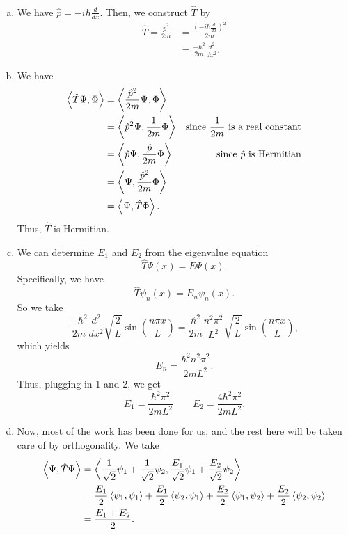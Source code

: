 \documentclass[12pt]{article} %
\begin{document}
\begin{solution}~
	\begin{enumerate}[(a)]
		\item We have $\hat{p}=-i\hbar \frac{d}{dx}$. Then, we construct $\hat{T}$ by
		\begin{align*}
		\hat{T}=\frac{\hat{p}^2}{2m} &= \frac{\left(-i\hbar \frac{d}{dx}\right)^2}{2m}\\
		&= \frac{-\hbar^2}{2m}\frac{d^2}{dx^2}.
		\end{align*}
		
		\item We have
		\begin{align*}
		\left\langle \hat{T}\Psi, \Phi \right\rangle &= \left\langle \frac{\hat{p}^2}{2m}\Psi, \Phi \right\rangle\\
		&= \left\langle \hat{p}^2 \Psi, \frac{1}{2m}\Phi \right\rangle &\textrm{since $\frac{1}{2m}$ is a real constant}\\
		&= \left\langle \hat{p}\Psi, \frac{\hat{p}}{2m} \Phi \right\rangle & \textrm{since $\hat{p}$ is Hermitian}\\
		&= \left\langle \Psi, \frac{\hat{p}^2}{2m} \Phi \right\rangle\\
		&= \left\langle \Psi, \hat{T}\Phi \right\rangle.
		\end{align*}
		Thus, $\hat{T}$ is Hermitian.
		
		\item We can determine $E_1$ and $E_2$ from the eigenvalue equation
		\[
		\hat{T} \Psi(x) = E \Psi(x).
		\]
		Specifically, we have
		\[
		\hat{T} \psi_n(x) = E_n \psi_n(x).
		\]
		So we take 
		\[
		\frac{-\hbar^2}{2m}\frac{d^2}{dx^2} \sqrt{\frac{2}{L}} \sin\left(\frac{n \pi x}{L}\right) = \frac{\hbar^2}{2m} \frac{n^2\pi^2}{L^2} \sqrt{\frac{2}{L}} \sin \left(\frac{n \pi x}{L}\right),
		\]
		which yields
		\[
		E_n = \frac{\hbar^2 n^2 \pi^2}{2mL^2}.
		\]
		Thus, plugging in 1 and 2, we get
		\[
		\boxed{E_1 = \frac{\hbar^2 \pi^2}{2mL^2} \qquad E_2 = \frac{4\hbar^2 \pi^2}{2mL^2}.}
		\]
		
		\item Now, most of the work has been done for us, and the rest here will be taken care of by orthogonality.  We take
		\begin{align*}
			\left\langle \Psi, \hat{T}\Psi \right\rangle &= \left\langle \frac{1}{\sqrt{2}} \psi_1 + \frac{1}{\sqrt{2}} \psi_2, \frac{E_1}{\sqrt{2}}\psi_1 + \frac{E_2}{\sqrt{2}}\psi_2 \right\rangle\\
			&= \frac{E_1}{2} \left\langle \psi_1, \psi_1 \right\rangle + \frac{E_1}{2}\left\langle \psi_2, \psi_1 \right\rangle+\frac{E_2}{2}\left\langle \psi_1, \psi_2 \right\rangle + \frac{E_2}{2} \left\langle \psi_2, \psi_2 \right\rangle\\
			&= \frac{E_1+E_2}{2}.
		\end{align*}
	\end{enumerate}
\end{solution}
\end{document}
